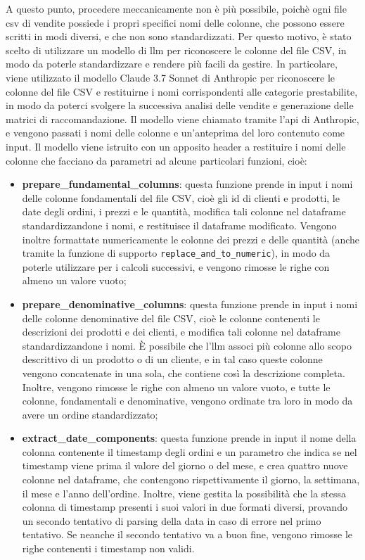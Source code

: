 A questo punto, procedere meccanicamente non è più possibile, poichè ogni file csv di vendite possiede i propri specifici nomi delle colonne, che possono essere scritti in modi diversi, e che non sono standardizzati. Per questo motivo, è stato scelto di utilizzare un modello di \gls{llm} per riconoscere le colonne del file CSV, in modo da poterle standardizzare e rendere più facili da gestire. In particolare, viene utilizzato il modello Claude 3.7 Sonnet di Anthropic per riconoscere le colonne del file CSV e restituirne i nomi corrispondenti alle categorie prestabilite, in modo da poterci svolgere la successiva analisi delle vendite e generazione delle matrici di raccomandazione. Il modello viene chiamato tramite l'\gls{api} di Anthropic, e vengono passati i nomi delle colonne e un'anteprima del loro contenuto come input. Il modello viene istruito con un apposito header a restituire i nomi delle colonne che facciano da parametri ad alcune particolari funzioni, cioè:
\begin{itemize}
    \item \textbf{prepare\_fundamental\_columns}: questa funzione prende in input i nomi delle colonne fondamentali del file CSV, cioè gli id di clienti e prodotti, le date degli ordini, i prezzi e le quantità, modifica tali colonne nel dataframe standardizzandone i nomi, e restituisce il dataframe modificato. Vengono inoltre formattate numericamente le colonne dei prezzi e delle quantità (anche tramite la funzione di supporto \texttt{replace\_and\_to\_numeric}), in modo da poterle utilizzare per i calcoli successivi, e vengono rimosse le righe con almeno un valore vuoto;
    \item \textbf{prepare\_denominative\_columns}: questa funzione prende in input i nomi delle colonne denominative del file CSV, cioè le colonne contenenti le descrizioni dei prodotti e dei clienti, e modifica tali colonne nel dataframe standardizzandone i nomi. È possibile che l'\gls{llm} associ più colonne allo scopo descrittivo di un prodotto o di un cliente, e in tal caso queste colonne vengono concatenate in una sola, che contiene così la descrizione completa. Inoltre, vengono rimosse le righe con almeno un valore vuoto, e tutte le colonne, fondamentali e denominative, vengono ordinate tra loro in modo da avere un ordine standardizzato;
    \item \textbf{extract\_date\_components}: questa funzione prende in input il nome della colonna contenente il timestamp degli ordini e un parametro che indica se nel timestamp viene prima il valore del giorno o del mese, e crea quattro nuove colonne nel dataframe, che contengono rispettivamente il giorno, la settimana, il mese e l'anno dell'ordine. Inoltre, viene gestita la possibilità che la stessa colonna di timestamp presenti i suoi valori in due formati diversi, provando un secondo tentativo di parsing della data in caso di errore nel primo tentativo. Se neanche il secondo tentativo va a buon fine, vengono rimosse le righe contenenti i timestamp non validi.
\end{itemize}

